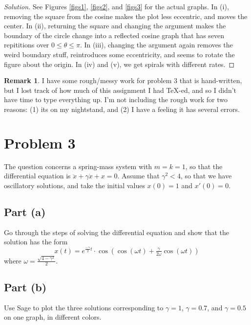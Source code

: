 \documentclass[letterpaper, 12pt]{amsart}
\theoremstyle{definition}  %
\newtheorem{remark}[thm]{Remark}
\begin{document}
		\begin{proof}[Solution]
			See Figures \ref{figs1}, \ref{figs2}, and \ref{figs3} for the actual graphs.
			In (i), removing the square from the cosine makes the plot less eccentric, and moves the center.
			In (ii), returning the square and changing the argument makes the boundary of the circle change into a reflected cosine graph that has seven repititions over $0 \leq \theta \leq \pi$.
			In (iii), changing the argument again removes the weird boundary stuff, reintroduces some eccentricity, and seems to rotate the figure about the origin.
			In (iv) and (v), we get spirals with different rates.
		\end{proof}

	\begin{remark}
		I have some rough/messy work for problem 3 that is hand-written, but I lost track of how much of this assignment I had TeX-ed, and so I didn't have time to type everything up.
		I'm not including the rough work for two reasons: (1) its on my nightstand, and (2) I have a feeling it has several errors.
	\end{remark}

	\section*{Problem 3}
	The question concerns a spring-mass system with $m = k = 1$, so that the differential equation is $\ddot{x} + \gamma\dot{x} + x = 0$. 
	Assume that $\gamma^{2} < 4$, so that we have oscillatory solutions, and take the initial values $x(0) = 1$ and $x'(0) = 0$.

		\subsection*{Part (a)}
		Go through the steps of solving the differential equation and show that the solution has the form $$x(t) = e^{\frac{-\gamma}{2}t}\cdot\cos\left( \cos{(\omega t)} + \tfrac{\gamma}{2\omega}\cos{(\omega t)} \right)$$ where $\omega = \frac{\sqrt{4 - \gamma^{2}}}{2}$.

		\subsection*{Part (b)}
		Use Sage to plot the three solutions corresponding to $\gamma = 1$, $\gamma = 0.7$, and $\gamma = 0.5$ on one graph, in different colors.
\end{document}
